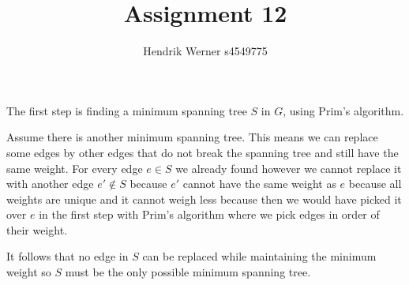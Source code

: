 \documentclass[12pt, a4paper]{article}
\title{Assignment 12}
\author{Hendrik Werner s4549775}
\begin{document}
\maketitle

\section{} %

\section{} %

\section{} %

\section{} %

\section{} %

The first step is finding a minimum spanning tree $S$ in $G$, using Prim's algorithm.

Assume there is another minimum spanning tree. This means we can replace some edges by other edges that do not break the spanning tree and still have the same weight. For every edge $e \in S$ we already found however we cannot replace it with another edge $e' \not\in S$ because $e'$ cannot have the same weight as $e$ because all weights are unique and it cannot weigh less because then we would have picked it over $e$ in the first step with Prim's algorithm where we pick edges in order of their weight.

It follows that no edge in $S$ can be replaced while maintaining the minimum weight so $S$ must be the only possible minimum spanning tree.
\end{document}

